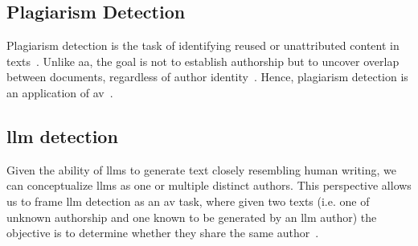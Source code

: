 \subsection{Plagiarism Detection}
Plagiarism detection is the task of identifying reused or unattributed content in texts~\citep{stein_intrinsic_2011,gohsen_task_oriented_2024}. 
Unlike \ac{aa}, the goal is not to establish authorship but to uncover overlap between documents, regardless of author identity~\citep{elmanarelbouanani_authorship_2014}.
Hence, plagiarism detection is an application of \ac{av}~\citep{rivera_soto_learning_2021}.


\subsection{\acs{llm} detection}
Given the ability of \acp{llm} to generate text closely resembling human writing, we can conceptualize \acp{llm} as one or multiple distinct authors.
This perspective allows us to frame \ac{llm} detection as an \ac{av} task, where given two texts (i.e. one of unknown authorship and one known to be generated by an \ac{llm} author) the objective is to determine whether they share the same author~\citep{llm_detection_av_2025}.


